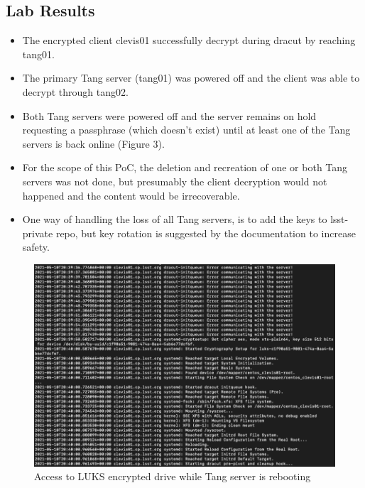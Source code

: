 \newpage
\subsection{Lab Results}
\begin{itemize}
  \item The encrypted client clevis01 successfully decrypt during dracut by reaching tang01.
  \item The primary Tang server (tang01) was powered off and the client was able to decrypt through tang02.
  \item Both Tang servers were powered off and the server remains on hold requesting a passphrase (which doesn't exist) until at least one of the Tang servers is back online (Figure 3).
  \item For the scope of this PoC, the deletion and recreation of one or both Tang servers was not done, but presumably the client decryption would not happened and the content would be irrecoverable.
  \item One way of handling the loss of all Tang servers, is to add the keys to lsst-private repo, but key rotation is suggested by the documentation to increase safety.
\end{itemize}

\begin{figure}
  \includegraphics[width=16cm]{images/image1.png}
  \centering
  \caption{Access to LUKS encrypted drive while Tang server is rebooting}
\end{figure}

\newpage
